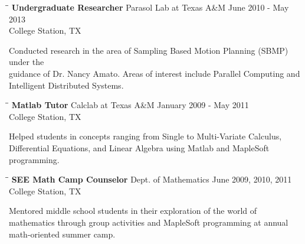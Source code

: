 \documentclass[8pt]{res}
\begin{document}
\begin{resume}
\begin{tabbing}
      \hspace{2.3in}\= \hspace{2.6in}\= \kill %
      \textbf{Undergraduate Researcher} \>Parasol Lab at Texas A\&M \>June 2010 - May 2013\\ \>College Station, TX
    \end{tabbing}\vspace{-20pt}      %
    Conducted research in the area of Sampling Based Motion Planning (SBMP) under the\\
    guidance of Dr. Nancy Amato.  Areas of interest include Parallel Computing and\\
    Intelligent Distributed Systems.
    \begin{tabbing}
      \hspace{2.3in}\= \hspace{2.6in}\= \kill %
      \textbf{Matlab Tutor} \>Calclab at Texas A\&M \>January 2009 - May 2011\\ \>College Station, TX
    \end{tabbing}\vspace{-20pt}
    Helped students in concepts ranging from Single to Multi-Variate Calculus,\\
    Differential Equations, and Linear Algebra using Matlab and MapleSoft programming.
    \begin{tabbing}
      \hspace{2.3in}\= \hspace{2.6in}\= \kill %
      \textbf{SEE Math Camp Counselor}  \>Dept. of Mathematics \> June 2009, 2010, 2011\\ \>College Station, TX
    \end{tabbing}\vspace{-20pt}
    Mentored middle school students in their exploration of the world of\\
    mathematics through group activities and MapleSoft programming at annual\\
    math-oriented summer camp.



\end{resume}
\end{document}
